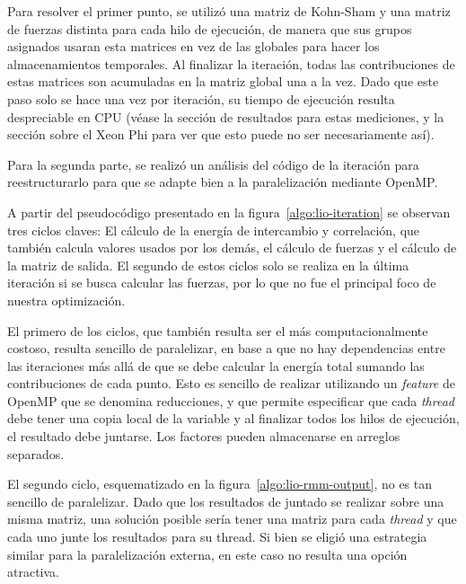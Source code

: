 Para resolver el primer punto, se utiliz\'o una matriz de Kohn-Sham y una matriz de
fuerzas distinta para cada hilo de ejecuci\'on, de manera que sus grupos asignados
usaran esta matrices en vez de las globales para hacer los almacenamientos temporales.
Al finalizar la iteraci\'on, todas
las contribuciones de estas matrices son acumuladas en la matriz global una a la
vez. Dado que este paso solo se hace una vez por iteraci\'on, su tiempo de ejecuci\'on resulta
despreciable en CPU (v\'ease la secci\'on de resultados para estas mediciones, y
la secci\'on sobre el Xeon Phi para ver que esto puede no ser necesariamente as\'i).



Para la segunda parte, se realiz\'o un an\'alisis del c\'odigo de la iteraci\'on para
reestructurarlo para que se adapte bien a la paralelizaci\'on mediante OpenMP.

A partir del pseudoc\'odigo presentado en la figura~\ref{algo:lio-iteration} se observan
tres ciclos claves: El c\'alculo de la energ\'ia de intercambio y
correlaci\'on, que tambi\'en calcula valores usados por los dem\'as, el
c\'alculo de fuerzas y el c\'alculo de la matriz de salida. El segundo de estos
ciclos solo se realiza en la \'ultima iteraci\'on si se busca calcular las fuerzas,
por lo que no fue el principal foco de nuestra optimizaci\'on.

El primero de los ciclos, que tambi\'en resulta ser el m\'as computacionalmente
costoso, resulta sencillo de paralelizar, en base a que no hay dependencias entre
las iteraciones m\'as all\'a de que se debe calcular la energ\'ia total sumando
las contribuciones de cada punto. Esto es sencillo de realizar utilizando un
\textit{feature} de OpenMP que se denomina reducciones, y que permite especificar
que cada \textit{thread} debe tener una copia local de la variable y al finalizar
todos los hilos de ejecuci\'on, el resultado debe juntarse. Los factores pueden
almacenarse en arreglos separados.

El segundo ciclo, esquematizado en la figura~\ref{algo:lio-rmm-output}, no es tan
sencillo de paralelizar. Dado que los resultados de juntado se realizar sobre
una misma matriz, una soluci\'on posible ser\'ia tener una matriz para cada
\textit{thread} y que cada uno junte los resultados para su thread. Si bien se
eligi\'o una estrategia similar para la paralelizaci\'on externa, en este caso no
resulta una opci\'on atractiva.

